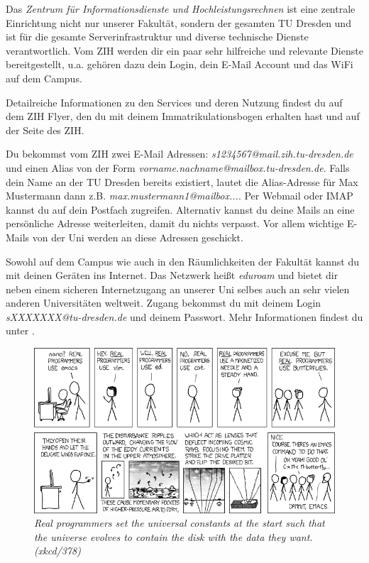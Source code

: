 

Das \textit{Zentrum für Informationsdienste und Hochleistungsrechnen} ist eine zentrale Einrichtung nicht nur unserer Fakultät, sondern der gesamten TU Dresden und ist für die gesamte Serverinfrastruktur und diverse technische Dienste verantwortlich. Vom ZIH werden dir ein paar sehr hilfreiche und relevante Dienste bereitgestellt, u.a. gehören dazu dein Login, dein E-Mail Account und das WiFi auf dem Campus.

Detailreiche Informationen zu den Services und deren Nutzung findest du auf dem ZIH Flyer, den du mit deinem Immatrikulationsbogen erhalten hast und auf der Seite des ZIH.

Du bekommst vom ZIH zwei E-Mail Adressen:
\textit{s1234567@mail.zih.tu-dresden.de} und einen Alias von der Form \textit{vorname.nachname@mailbox.tu-dresden.de}.
Falls dein Name an der TU Dresden bereits existiert, lautet die Alias-Adresse für Max Mustermann dann z.B. \textit{max.mustermann1@mailbox...}.
Per Webmail oder IMAP kannst du auf dein Postfach zugreifen.
Alternativ kannst du deine Mails an eine persönliche Adresse weiterleiten, damit du nichts verpasst.
Vor allem wichtige E-Mails von der Uni werden an diese Adressen geschickt.

Sowohl auf dem Campus wie auch in den Räumlichkeiten der Fakultät kannst du mit deinen Geräten ins Internet.
Das Netzwerk heißt \textit{eduroam} und bietet dir neben einem sicheren Internetzugang an unserer Uni selbes auch an sehr vielen anderen Universitäten weltweit. 
Zugang bekommst du mit deinem Login \textit{sXXXXXXX@tu-dresden.de} und deinem Passwort. Mehr Informationen findest du unter .

\begin{figure}[h!]
\centering \includegraphics[width=\linewidth]{img/xkcd/real_programmers.png}
\caption*{{\small \textit{Real programmers set the universal constants at the start such that the universe evolves to contain the disk with the data they want. (xkcd/378)}}}
\end{figure}
